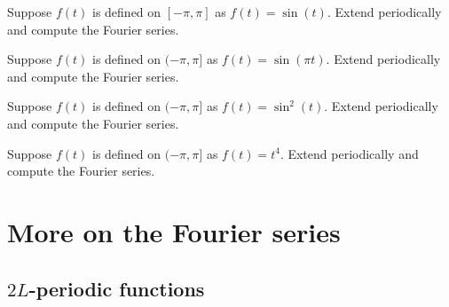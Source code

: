 \documentclass[12pt]{book}
\begin{document}
\setcounter{exercise}{100}

\begin{exercise}
Suppose $f(t)$ is defined on $[-\pi,\pi]$ as $f(t) = \sin(t)$.  Extend
periodically and compute the Fourier series.
\end{exercise}

\begin{exercise}
Suppose $f(t)$ is defined on $(-\pi,\pi]$ as $f(t) = \sin(\pi t)$.  Extend
periodically and compute the Fourier series.
\end{exercise}

\begin{exercise}
Suppose $f(t)$ is defined on $(-\pi,\pi]$ as $f(t) = \sin^2(t)$.
Extend
periodically and compute the Fourier series.
\end{exercise}

\begin{exercise}
Suppose $f(t)$ is defined on $(-\pi,\pi]$ as $f(t) = t^4$.
Extend periodically and compute the Fourier series.
\end{exercise}


\sectionnewpage
\section{More on the Fourier series}



\subsection{$2L$-periodic functions}
\end{document}
